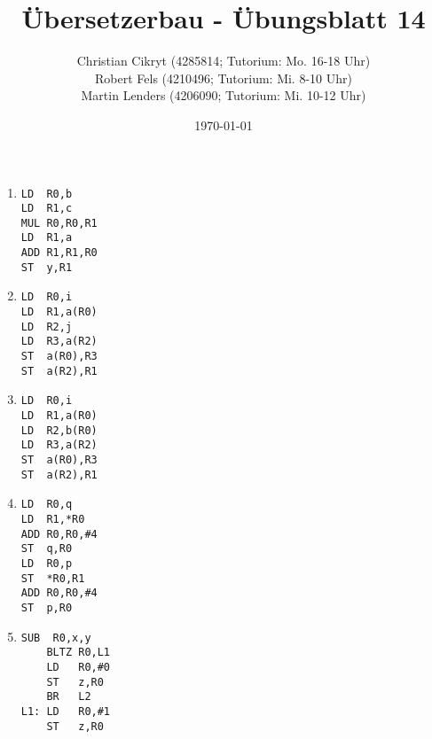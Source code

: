 \documentclass[a4paper,10pt]{scrartcl}
\title{Übersetzerbau - Übungsblatt 14}
\author{Christian Cikryt (4285814; Tutorium: Mo. 16-18 Uhr)\\
  Robert Fels (4210496; Tutorium: Mi. 8-10 Uhr)\\
  Martin Lenders (4206090; Tutorium: Mi. 10-12 Uhr)
  }
\date{\today}
\begin{document}
\maketitle

\section{}
\begin{enumerate}
\item   \begin{lstlisting}
LD  R0,b
LD  R1,c
MUL R0,R0,R1
LD  R1,a
ADD R1,R1,R0
ST  y,R1
\end{lstlisting}

\item   \begin{lstlisting}
LD  R0,i
LD  R1,a(R0)
LD  R2,j
LD  R3,a(R2)
ST  a(R0),R3
ST  a(R2),R1
\end{lstlisting}

\item   \begin{lstlisting}
LD  R0,i
LD  R1,a(R0)
LD  R2,b(R0)
LD  R3,a(R2)
ST  a(R0),R3
ST  a(R2),R1
\end{lstlisting}

\item   \begin{lstlisting}
LD  R0,q
LD  R1,*R0
ADD R0,R0,#4
ST  q,R0
LD  R0,p
ST  *R0,R1
ADD R0,R0,#4
ST  p,R0
\end{lstlisting}

\item   \begin{lstlisting}[emph={L1,L2}]
    SUB  R0,x,y
    BLTZ R0,L1
    LD   R0,#0
    ST   z,R0
    BR   L2
L1: LD   R0,#1
    ST   z,R0
\end{lstlisting}
\end{enumerate}
\end{document}
